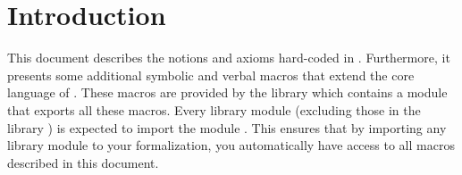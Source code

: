 \documentclass{stex}
\begin{document}


\section{Introduction}\label{sec:introduction}

This document describes the notions and axioms hard-coded in \Naproche.
Furthermore, it presents some additional symbolic and verbal macros that extend
the core language of \ForTheL.
These macros are provided by the library  which contains a
module  that exports all these macros.
Every library module (excluding those in the library ) is expected to
import the module .
This ensures that by importing any library module to your formalization,
you automatically have access to all macros described in this document.


\ifinputref\else{}\fi
\end{document}
